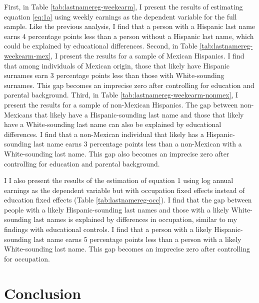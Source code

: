 First, in Table \ref{tab:lastnamereg-weekearm}, I present the results of estimating equation \ref{eq:1a} using weekly earnings as the dependent variable for the full sample. Like the previous analysis, I find that a person with a Hispanic last name earns 4 percentage points less than a person without a Hispanic last name, which could be explained by educational differences. Second, in Table \ref{tab:lastnamereg-weekearm-mex}, I present the results for a sample of Mexican Hispanics. I find that among individuals of Mexican origin, those that likely have Hispanic surnames earn 3 percentage points less than those with White-sounding surnames. This gap becomes an imprecise zero after controlling for education and parental background. Third, in Table \ref{tab:lastnamereg-weekearm-nonmex}, I present the results for a sample of non-Mexican Hispanics. The gap between non-Mexicans that likely have a Hispanic-sounding last name and those that likely have a White-sounding last name can also be explained by educational differences. I find that a non-Mexican individual that likely has a Hispanic-sounding last name earns 3 percentage points less than a non-Mexican with a White-sounding last name. This gap also becomes an imprecise zero after controlling for education and parental background.

I I also present the results of the estimation of equation 1 using log annual earnings as the dependent variable but with occupation fixed effects instead of education fixed effects (Table \ref{tab:lastnamereg-occ}). I find that the gap between people with a likely Hispanic-sounding last names and those with a likely White-sounding last names is explained by differences in occupation, similar to my findings with educational controls. I find that a person with a likely Hispanic-sounding last name earns 5 percentage points less than a person with a likely White-sounding last name. This gap becomes an imprecise zero after controlling for occupation.


\section{Conclusion}\label{sec:con1}

